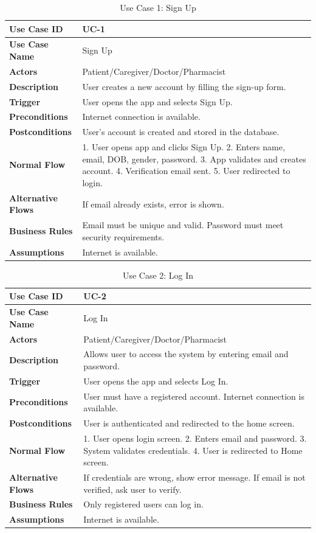 \documentclass[12pt, a4paper, oneside]{report}
\begin{document}
\begin{table}[H]
\centering
\caption{Use Case 1: Sign Up}
\begin{tabularx}{\textwidth}{|l|X|}
\hline
\textbf{Use Case ID} & UC-1 \\ \hline
\textbf{Use Case Name} & Sign Up \\ \hline
\textbf{Actors} & Patient/Caregiver/Doctor/Pharmacist \\ \hline
\textbf{Description} & User creates a new account by filling the sign-up form. \\ \hline
\textbf{Trigger} & User opens the app and selects Sign Up. \\ \hline
\textbf{Preconditions} & Internet connection is available. \\ \hline
\textbf{Postconditions} & User's account is created and stored in the database. \\ \hline
\textbf{Normal Flow} & 1. User opens app and clicks Sign Up. 2. Enters name, email, DOB, gender, password. 3. App validates and creates account. 4. Verification email sent. 5. User redirected to login. \\ \hline
\textbf{Alternative Flows} & If email already exists, error is shown. \\ \hline
\textbf{Business Rules} & Email must be unique and valid. Password must meet security requirements. \\ \hline
\textbf{Assumptions} & Internet is available. \\ \hline
\end{tabularx}
\end{table}

\begin{table}[H]
\centering
\caption{Use Case 2: Log In}
\begin{tabularx}{\textwidth}{|l|X|}
\hline
\textbf{Use Case ID} & UC-2 \\ \hline
\textbf{Use Case Name} & Log In \\ \hline
\textbf{Actors} & Patient/Caregiver/Doctor/Pharmacist \\ \hline
\textbf{Description} & Allows user to access the system by entering email and password. \\ \hline
\textbf{Trigger} & User opens the app and selects Log In. \\ \hline
\textbf{Preconditions} & User must have a registered account. Internet connection is available. \\ \hline
\textbf{Postconditions} & User is authenticated and redirected to the home screen. \\ \hline
\textbf{Normal Flow} & 1. User opens login screen. 2. Enters email and password. 3. System validates credentials. 4. User is redirected to Home screen. \\ \hline
\textbf{Alternative Flows} & If credentials are wrong, show error message. If email is not verified, ask user to verify. \\ \hline
\textbf{Business Rules} & Only registered users can log in. \\ \hline
\textbf{Assumptions} & Internet is available. \\ \hline
\end{tabularx}
\end{table}
\end{document}
